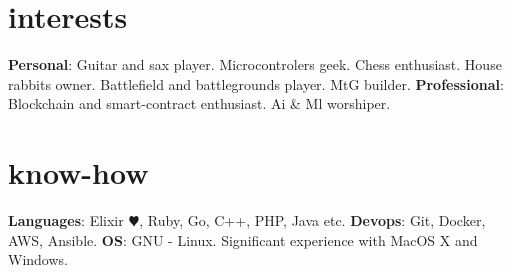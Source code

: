 \documentclass[]{cv-style}
\begin{document}
\section{interests}

\textbf{Personal}: Guitar and sax player. Microcontrolers geek. Chess enthusiast. House rabbits owner. Battlefield and battlegrounds player. MtG builder. \textbf{Professional}: Blockchain and smart-contract enthusiast. Ai \& Ml worshiper.


\section{know-how}
  \textbf{Languages}: Elixir {\color{red} $\varheartsuit$}, Ruby, Go, C++, PHP, Java etc.
  \textbf{Devops}: Git, Docker, AWS, Ansible.
  \textbf{OS}: GNU - Linux. Significant experience with MacOS X and Windows.
\end{document}
